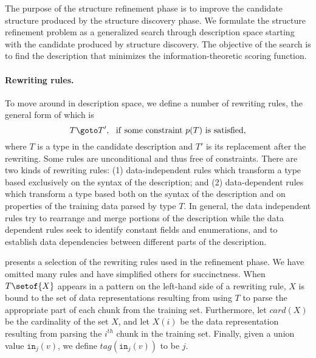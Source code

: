 The purpose of the structure refinement phase is to improve
the candidate structure produced by the structure discovery phase. We
formulate the structure refinement problem as a generalized search
through description space starting with the candidate produced by
structure discovery. The
objective of the search is to find the description that minimizes
the information-theoretic scoring function.

\paragraph*{Rewriting rules.}
To move around in description space, we define a number of 
rewriting rules, the general form of which is
\[T \goto T', ~~ {\rm if~ some~ constraint~} p(T)~ {\rm is~ satisfied,}\]
where $T$ is a type in the candidate description and $T'$ is its
replacement after the
rewriting.  Some rules are unconditional and thus free of constraints.
There are two kinds of rewriting rules: (1) data-independent rules which
transform a type based exclusively on the syntax of the description; 
and (2) data-dependent
rules which transform a type based both on the syntax of the description
and on properties of the training data parsed by type $T$.  In general, 
the data independent rules try to rearrange and merge portions
of the description while the data dependent rules seek to identify 
constant fields and enumerations, and to establish data dependencies
between different parts of the description.

 presents a selection of the rewriting rules used in
the refinement phase. We have omitted many rules and have simplified
others for succinctness.
When $T\setof{X}$ appears in a pattern on the left-hand side of a rewriting
rule, $X$ is bound to the set of data representations resulting
from using $T$ to parse the appropriate part of each chunk from the training
set. Furthermore, let $card(X)$ be the cardinality of the set $X$, 
and let $X(i)$ be the data representation resulting
from parsing the $i^{th}$ chunk in the training set. Finally, given a union
value $\mathtt{in}_j(v)$, we define $tag(\mathtt{in}_j(v))$ to be $j$.

